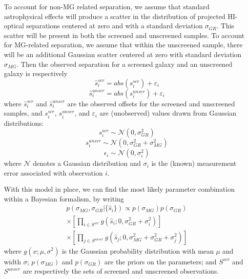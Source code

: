 \documentclass{emulateapj}
\begin{document}
To account for non-MG related separation, we assume that standard
astrophysical effects will produce a
scatter in the distribution of projected HI-optical separations centered
at zero and with a standard deviation $\sigma_{GR}$.  This scatter will
be present in both the screened and unscreened samples.
To account for MG-related separation, we
assume that within the unscreened sample, there will be an additional
Gaussian scatter centered at zero with standard deviation $\sigma_{MG}$.
Then the observed separation for a screened galaxy and an unscreened galaxy
is respectively
\begin{equation}
  \hat{s}^{scr}_i = abs(s^{scr}_i) + \varepsilon_i \nonumber
\end{equation}
\begin{equation}
  \hat{s}^{unscr}_i = abs(s^{unscr}_i) + \varepsilon_i
\end{equation}
where $\hat{s}^{scr}_i$ and $\hat{s}^{unscr}_i$ are the observed offsets
for the screened and unscreened samples, and
 $s^{scr}_i$, $s^{unscr}_i$, and $\varepsilon_i$ are (unobserved) values
drawn from Gaussian distributions:
\begin{equation}
  s^{scr}_i \sim \mathcal{N}(0, \sigma_{GR}^2) \nonumber
\end{equation}
\begin{equation}
  s^{unscr}_i \sim \mathcal{N}(0, \sigma_{GR}^2 + \sigma_{MG}^2) \nonumber
\end{equation}
\begin{equation}
  \epsilon_i \sim \mathcal{N}(0, \sigma_i^2)
\end{equation}
where  $\mathcal{N}$ denotes a Gaussian distribution and $\sigma_i$ is the
(known)
measurement error associated with observation $i$.

With this model in place, we can find the most likely parameter combination
within a Bayesian formalism, by writing
\begin{equation}
\begin{split}
  \label{eq:separation_likelihood}
  p(\sigma_{MG}, \sigma_{GR}|\{\hat{s}_i\})
  \propto
  p(\sigma_{MG})p(\sigma_{GR}) \\
  \times \left[ \prod_{i \in S^{scr}} g(\hat{s}_i;0, \sigma_{GR}^2 +
\sigma_i^2)\right]\\
\times
  \left[ \prod_{j \in S^{unscr}} g(\hat{s}_j;0, \sigma_{MG}^2 +
\sigma_{GR}^2 + \sigma_j^2)\right]
\end{split}
\end{equation}
where $g(x;\mu,\sigma^2)$ is the Gaussian probability distribution with
mean $\mu$ and width $\sigma$; $p(\sigma_{MG})$ and $p(\sigma_{GR})$ are the
priors on the parameters; and $S^{scr}$ and $S^{unscr}$ are respectively the
sets of screened and unscreened observations.
\end{document}
